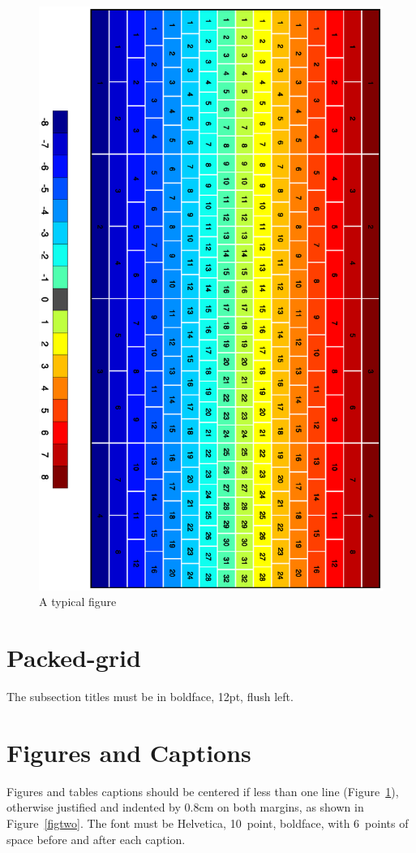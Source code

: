 \documentclass{SBCbookchapter}
\begin{document}
\begin{figure}
	\centerline{\includegraphics{grid2}}
	\caption{A typical figure}
	\label{figone}
\end{figure}

\section{Packed-grid}
The subsection titles must be in boldface, 12pt, flush left.

\section{Figures and Captions}
\label{sec:captionmargins}
Figures and tables captions should be centered if less than one line
(Figure~\ref{figone}), otherwise justified and indented by 0.8cm on
both margins, as shown in Figure~\ref{figtwo}. The font must be
Helvetica, 10~point, boldface, with 6~points of space before and after
each caption.
\end{document}
